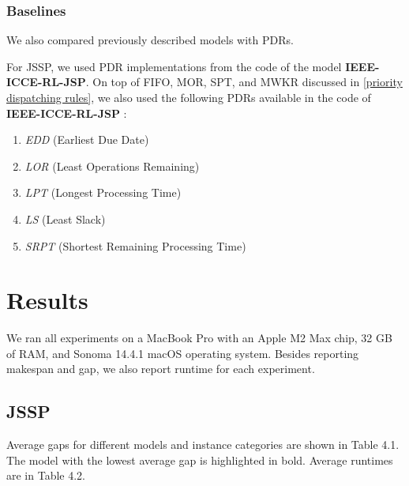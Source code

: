 \subsubsection{Baselines}
We also compared previously described models with PDRs.
\par
For JSSP, we used PDR implementations from the code of the model \textbf{IEEE-ICCE-RL-JSP}. On top of FIFO, MOR, SPT, and MWKR discussed in \ref{priority dispatching rules}, we also used the following PDRs available in the code of \textbf{IEEE-ICCE-RL-JSP} \cite{github_ieee_icce_rl_jsp}:
\begin{enumerate}
    \item \textit{EDD} (Earliest Due Date)
    \item \textit{LOR} (Least Operations Remaining)
    \item \textit{LPT} (Longest Processing Time)
    \item \textit{LS} (Least Slack)
    \item \textit{SRPT} (Shortest Remaining Processing Time)
\end{enumerate}

\section{Results}
We ran all experiments on a MacBook Pro with an Apple M2 Max chip, 32 GB of RAM, and Sonoma 14.4.1 macOS operating system. Besides reporting makespan and gap, we also report runtime for each experiment. 

\subsection{JSSP}
Average gaps for different models and instance categories are shown in Table 4.1. The model with the lowest average gap is highlighted in bold. Average runtimes are in Table 4.2. 

